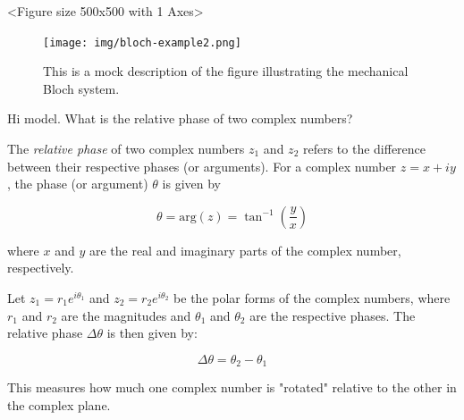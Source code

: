 
  \begin{result}
  <Figure size 500x500 with 1 Axes>
  \end{result}

\begin{figure}[h!]
  \centering
  \texttt{[image: img/bloch-example2.png]}
  \caption{This is a mock description of the figure illustrating the mechanical Bloch system.}
  \label{fig:mechanical_bloch}
\end{figure}


\begin{ai}
Hi model. What is the relative phase of two complex numbers?
\end{ai}

\begin{airesult}
The \textit{relative phase} of two complex numbers \( z_1 \) and \( z_2 \) refers to the difference
between their respective phases (or arguments). For a complex number \( z = x + iy \), the phase (or
argument) \(\theta\) is given by

\[
\theta = \text{arg}(z) = \tan^{-1}\left(\frac{y}{x}\right)
\]

where \( x \) and \( y \) are the real and imaginary parts of the complex number, respectively.

\vsp

Let \( z_1 = r_1 e^{i\theta_1} \) and \( z_2 = r_2 e^{i\theta_2} \) be the polar forms of the
complex numbers, where \( r_1 \) and \( r_2 \) are the magnitudes and \( \theta_1 \) and \( \theta_2
\) are the respective phases. The relative phase \(\Delta \theta\) is then given by:

\[
\Delta \theta = \theta_2 - \theta_1
\]

\vsp

This measures how much one complex number is "rotated" relative to the other in the complex plane.
\end{airesult}
